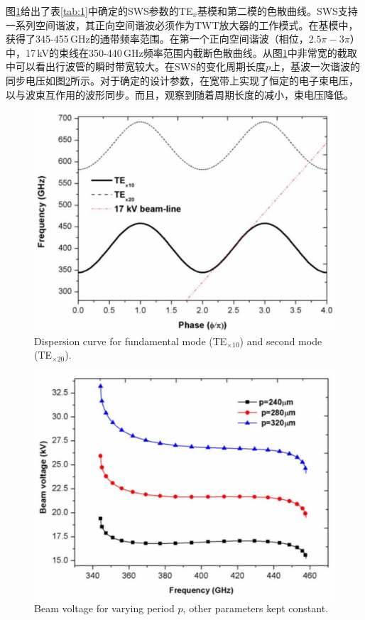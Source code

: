 \documentclass[10pt,a4paper,UTF8]{ctexart}
\begin{document}
图\ref{fig3}给出了表\ref{tab:1}中确定的SWS参数的TE$ _x $基模和第二模的色散曲线。SWS支持一系列空间谐波，其正向空间谐波必须作为TWT放大器的工作模式。在基模中，获得了345-455\,GHz的通带频率范围。在第一个正向空间谐波（相位，$2.5 \pi - 3\pi $）中，17\,kV的束线在350-440\,GHz频率范围内截断色散曲线。从图\ref{fig3}中非常宽的截取中可以看出行波管的瞬时带宽较大。在SWS的变化周期长度$ p $上，基波一次谐波的同步电压如图\ref{fig4}所示。对于确定的设计参数，在宽带上实现了恒定的电子束电压，以与波束互作用的波形同步。而且，观察到随着周期长度的减小，束电压降低。

\begin{figure}[phtb]
	\centering
	\includegraphics[width=0.95\linewidth]{figure/fig3}
	\caption{Dispersion curve for fundamental mode (TE$ _{\times 10} $) and second mode (TE$ _{\times 20} $).}
	\label{fig3}
\end{figure}

\begin{figure}[phtb]
	\centering
	\includegraphics[width=0.95\linewidth]{figure/fig4}
	\caption{Beam voltage for varying period $ p $, other parameters kept constant.}
	\label{fig4}
\end{figure}
\end{document}
